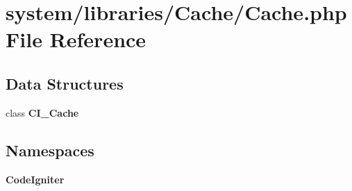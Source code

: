 \section{system/libraries/\-Cache/\-Cache.php File Reference}
\label{_cache_8php}
\subsection*{Data Structures}
\begin{DoxyCompactItemize}
\item 
class {\bf C\-I\-\_\-\-Cache}
\end{DoxyCompactItemize}
\subsection*{Namespaces}
\begin{DoxyCompactItemize}
\item 
{\bf Code\-Igniter}
\end{DoxyCompactItemize}
